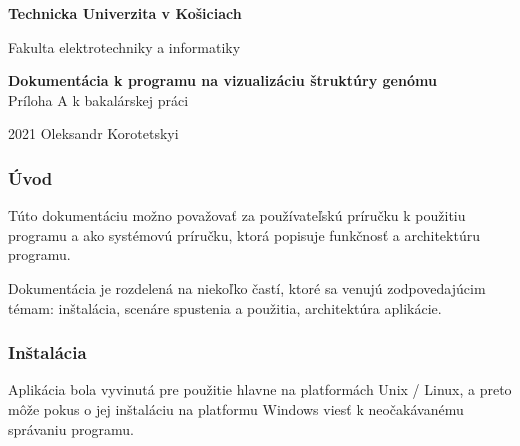 

\thispagestyle{empty}
	\begin{center}
		\vspace*{1cm}
		
		\textbf{\large Technicka Univerzita v Košiciach }
		
		\vspace{0.4cm}
		Fakulta elektrotechniky a informatiky
		
		\vspace{4.5cm}
		
		\textbf{\Large Dokumentácia k programu na vizualizáciu štruktúry genómu\\}
		\vspace{1.5cm}
		Príloha A k bakalárskej práci
		\vfill
		
		
		\vspace{2.8cm}
		
		{\raggedleft\vfill{%
		 		
			}\par}
		
		{\raggedright\vfill{%
				2021 \quad\quad\quad\quad\quad\quad\quad\quad\quad\quad\quad\quad\quad\quad\quad\quad\quad\quad\quad\quad\quad\quad\quad Oleksandr Korotetskyi
			}\par}
		
		
		
	\end{center}

\newpage
{}
\subsubsection{\Large{Úvod}}
Túto dokumentáciu možno považovať za používateľskú príručku k použitiu programu a ako systémovú príručku, ktorá popisuje funkčnosť a architektúru programu.

Dokumentácia je rozdelená na niekoľko častí, ktoré sa venujú zodpovedajúcim témam: inštalácia, scenáre spustenia a použitia, architektúra aplikácie.

\subsubsection{\Large{Inštalácia}}
Aplikácia bola vyvinutá pre použitie hlavne na platformách Unix / Linux, a preto môže pokus o jej inštaláciu na platformu Windows viesť k neočakávanému správaniu programu.


